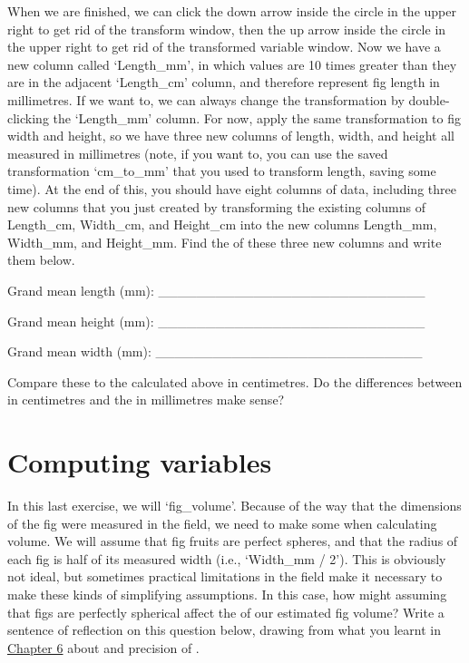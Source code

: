 \documentclass[
  openany]{krantz}
\begin{document}
When we are finished, we can click the down arrow inside the circle in the upper right to get rid of the transform window, then the up arrow inside the circle in the upper right to get rid of the transformed variable window.
Now we have a new column called `Length\_mm', in which values are 10 times greater than they are in the adjacent `Length\_cm' column, and therefore represent fig length in millimetres.
If we want to, we can always change the transformation by double-clicking the `Length\_mm' column.
For now, apply the same transformation to fig width and height, so we have three new columns of length, width, and height all measured in millimetres (note, if you want to, you can use the saved transformation `cm\_to\_mm' that you used to transform length, saving some time).
At the end of this, you should have eight columns of data, including three new columns that you just created by transforming the existing columns of Length\_cm, Width\_cm, and Height\_cm into the new columns Length\_mm, Width\_mm, and Height\_mm.
Find the  of these three new columns and write them below.

Grand mean length (mm): \_\_\_\_\_\_\_\_\_\_\_\_\_\_\_\_\_\_\_\_\_\_\_\_\_\_\_\_

Grand mean height (mm): \_\_\_\_\_\_\_\_\_\_\_\_\_\_\_\_\_\_\_\_\_\_\_\_\_\_\_\_

Grand mean width (mm): \_\_\_\_\_\_\_\_\_\_\_\_\_\_\_\_\_\_\_\_\_\_\_\_\_\_\_\_

Compare these  to the  calculated above in centimetres.
Do the differences between  in centimetres and the  in millimetres make sense?

\hypertarget{computing_variables_02}{%
\section{Computing variables}\label{computing_variables_02}}

In this last exercise, we will  `fig\_volume'.
Because of the way that the dimensions of the fig were measured in the field, we need to make some  when calculating volume.
We will assume that fig fruits are perfect spheres, and that the radius of each fig is half of its measured width (i.e., `Width\_mm / 2').
This is obviously not ideal, but sometimes practical limitations in the field make it necessary to make these kinds of simplifying assumptions.
In this case, how might assuming that figs are perfectly spherical affect the  of our estimated fig volume?
Write a sentence of reflection on this question below, drawing from what you learnt in \protect\hyperlink{Chapter_6}{Chapter 6} about  and precision of .
\end{document}
